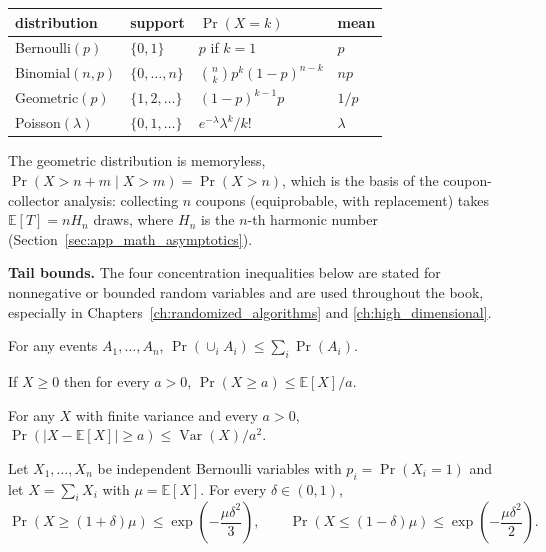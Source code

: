 \begin{center}
\begin{tabular}{llll}
\toprule
distribution & support & $\Pr(X = k)$ & mean \\
\midrule
Bernoulli$(p)$ & $\{0,1\}$ & $p$ if $k=1$ & $p$ \\
Binomial$(n,p)$ & $\{0,\dots,n\}$ & $\binom{n}{k} p^k (1-p)^{n-k}$ & $np$ \\
Geometric$(p)$ & $\{1,2,\dots\}$ & $(1-p)^{k-1} p$ & $1/p$ \\
Poisson$(\lambda)$ & $\{0,1,\dots\}$ & $e^{-\lambda}\lambda^k / k!$ & $\lambda$ \\
\bottomrule
\end{tabular}
\end{center}

The geometric distribution is memoryless, $\Pr(X > n+m \mid X > m) = \Pr(X > n)$,
which is the basis of the coupon-collector analysis: collecting $n$ coupons
(equiprobable, with replacement) takes $\mathbb{E}[T] = n H_n$ draws, where
$H_n$ is the $n$-th harmonic number (Section~\ref{sec:app_math_asymptotics}).

\medskip
\noindent\textbf{Tail bounds.}
The four concentration inequalities below are stated for nonnegative or
bounded random variables and are used throughout the book, especially in
Chapters~\ref{ch:randomized_algorithms} and \ref{ch:high_dimensional}.

\begin{theorem}\label{thm:appmath_union_bound}
  For any events $A_1,\dots,A_n$,
  $\Pr(\cup_i A_i) \le \sum_i \Pr(A_i)$.
\end{theorem}

\begin{theorem}\label{thm:appmath_markov}
  If $X \ge 0$ then for every $a > 0$,
  $\Pr(X \ge a) \le \mathbb{E}[X] / a$.
\end{theorem}

\begin{theorem}\label{thm:appmath_chebyshev}
  For any $X$ with finite variance and every $a > 0$,
  $\Pr(|X - \mathbb{E}[X]| \ge a) \le \operatorname{Var}(X) / a^2$.
\end{theorem}

\begin{theorem}\label{thm:appmath_chernoff}
  Let $X_1,\dots,X_n$ be independent Bernoulli variables with
  $p_i = \Pr(X_i = 1)$ and let $X = \sum_i X_i$ with $\mu = \mathbb{E}[X]$.
  For every $\delta \in (0,1)$,
  \[
    \Pr(X \ge (1+\delta)\mu) \le \exp\!\left(-\frac{\mu \delta^2}{3}\right),
    \qquad
    \Pr(X \le (1-\delta)\mu) \le \exp\!\left(-\frac{\mu \delta^2}{2}\right).
  \]
\end{theorem}

